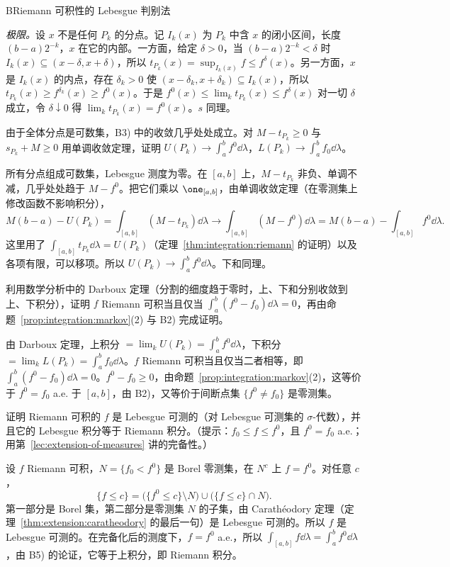 \begin{probleme}{B}{Riemann 可积性的 Lebesgue 判别法}
\begin{questions}
\begin{solution}
\emph{极限。}设 $x$ 不是任何 $P_k$ 的分点。记 $I_k(x)$ 为 $P_k$ 中含 $x$ 的闭小区间，长度 $(b-a)2^{-k}$，$x$ 在它的内部。一方面，给定 $\delta>0$，当 $(b-a)2^{-k}<\delta$ 时 $I_k(x)\subseteq(x-\delta,x+\delta)$，所以 $t_{P_k}(x)=\sup_{I_k(x)}f\leqslant f^\delta(x)$。另一方面，$x$ 是 $I_k(x)$ 的内点，存在 $\delta_k>0$ 使 $(x-\delta_k,x+\delta_k)\subseteq I_k(x)$，所以 $t_{P_k}(x)\geqslant f^{\delta_k}(x)\geqslant f^0(x)$。于是 $f^0(x)\leqslant\lim_kt_{P_k}(x)\leqslant f^\delta(x)$ 对一切 $\delta$ 成立，令 $\delta\downarrow0$ 得 $\lim_kt_{P_k}(x)=f^0(x)$。$s$ 同理。
\end{solution}
\item 由于全体分点是可数集，B3) 中的收敛几乎处处成立。对 $M-t_{P_k}\geqslant0$ 与 $s_{P_k}+M\geqslant0$ 用单调收敛定理，证明 $U(P_k)\to\int_a^bf^0\dd\lambda$，$L(P_k)\to\int_a^bf_0\dd\lambda$。
\begin{solution}
所有分点组成可数集，Lebesgue 测度为零。在 $[a,b]$ 上，$M-t_{P_k}$ 非负、单调不减，几乎处处趋于 $M-f^0$。把它们乘以 $\one_{[a,b]}$，由单调收敛定理（在零测集上修改函数不影响积分），
\[
M(b-a)-U(P_k)=\int_{[a,b]}(M-t_{P_k})\dd\lambda\to\int_{[a,b]}(M-f^0)\dd\lambda=M(b-a)-\int_{[a,b]}f^0\dd\lambda .
\]
这里用了 $\int_{[a,b]}t_{P_k}\dd\lambda=U(P_k)$（定理~\ref{thm:integration:riemann} 的证明）以及各项有限，可以移项。所以 $U(P_k)\to\int_a^bf^0\dd\lambda$。下和同理。
\end{solution}
\item 利用数学分析中的 Darboux 定理（分割的细度趋于零时，上、下和分别收敛到上、下积分），证明 $f$ Riemann 可积当且仅当 $\int_a^b(f^0-f_0)\dd\lambda=0$，再由命题~\ref{prop:integration:markov}(2) 与 B2) 完成证明。
\begin{solution}
由 Darboux 定理，上积分 $=\lim_kU(P_k)=\int_a^bf^0\dd\lambda$，下积分 $=\lim_kL(P_k)=\int_a^bf_0\dd\lambda$。$f$ Riemann 可积当且仅当二者相等，即 $\int_a^b(f^0-f_0)\dd\lambda=0$。$f^0-f_0\geqslant0$，由命题~\ref{prop:integration:markov}(2)，这等价于 $f^0=f_0$ a.e. 于 $[a,b]$，由 B2)，又等价于间断点集 $\{f^0\neq f_0\}$ 是零测集。
\end{solution}
\item 证明 Riemann 可积的 $f$ 是 Lebesgue 可测的（对 Lebesgue 可测集的 $\sigma$-代数），并且它的 Lebesgue 积分等于 Riemann 积分。（提示：$f_0\leqslant f\leqslant f^0$，且 $f^0=f_0$ a.e.；用第~\ref{lec:extension-of-measures} 讲的完备性。）
\begin{solution}
设 $f$ Riemann 可积，$N=\{f_0<f^0\}$ 是 Borel 零测集，在 $N^c$ 上 $f=f^0$。对任意 $c$，
\[
\{f\leqslant c\}=\bigl(\{f^0\leqslant c\}\setminus N\bigr)\cup\bigl(\{f\leqslant c\}\cap N\bigr).
\]
第一部分是 Borel 集，第二部分是零测集 $N$ 的子集，由 Carathéodory 定理（定理~\ref{thm:extension:caratheodory} 的最后一句）是 Lebesgue 可测的。所以 $f$ 是 Lebesgue 可测的。在完备化后的测度下，$f=f^0$ a.e.，所以 $\int_{[a,b]}f\dd\lambda=\int_a^bf^0\dd\lambda$，由 B5) 的论证，它等于上积分，即 Riemann 积分。


\end{solution}
\end{questions}
\end{probleme}
